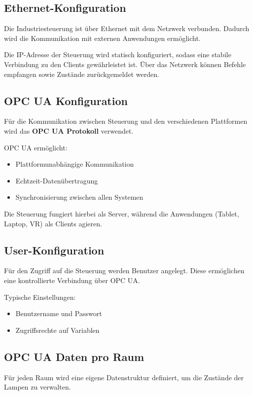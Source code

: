 \subsection{Ethernet-Konfiguration}

Die Industriesteuerung ist über Ethernet mit dem Netzwerk verbunden. 
Dadurch wird die Kommunikation mit externen Anwendungen ermöglicht.

Die IP-Adresse der Steuerung wird statisch konfiguriert, sodass eine stabile Verbindung zu den Clients gewährleistet ist. 
Über das Netzwerk können Befehle empfangen sowie Zustände zurückgemeldet werden.

\subsection{OPC UA Konfiguration}

Für die Kommunikation zwischen Steuerung und den verschiedenen Plattformen wird das \textbf{OPC UA Protokoll} verwendet.

OPC UA ermöglicht:
\begin{itemize}
    \item Plattformunabhängige Kommunikation
    \item Echtzeit-Datenübertragung
    \item Synchronisierung zwischen allen Systemen
\end{itemize}

Die Steuerung fungiert hierbei als Server, während die Anwendungen (Tablet, Laptop, VR) als Clients agieren.

\subsection{User-Konfiguration}

Für den Zugriff auf die Steuerung werden Benutzer angelegt. 
Diese ermöglichen eine kontrollierte Verbindung über OPC UA.

Typische Einstellungen:
\begin{itemize}
    \item Benutzername und Passwort
    \item Zugriffsrechte auf Variablen
\end{itemize}

\subsection{OPC UA Daten pro Raum}

Für jeden Raum wird eine eigene Datenstruktur definiert, um die Zustände der Lampen zu verwalten.

